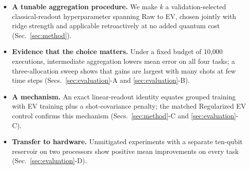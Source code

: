 \begin{itemize}
  \setlength{\itemsep}{1pt}
  \setlength{\parskip}{0pt}
  \setlength{\parsep}{0pt}
  \setlength{\topsep}{2pt}
  \item \textbf{A tunable aggregation procedure.} We make $k$ a
  validation-selected classical-readout hyperparameter spanning Raw to EV,
  chosen jointly with ridge strength and applicable retroactively at no added
  quantum cost (Sec.~\ref{sec:method}).

  \item \textbf{Evidence that the choice matters.} Under a fixed budget of
  10,000 executions, intermediate aggregation lowers mean error on all four
  tasks; a three-allocation sweep shows that gains are largest with many shots
  at few time steps
  (Secs.~\ref{sec:evaluation}-A and \ref{sec:evaluation}-B).

  \item \textbf{A mechanism.} An exact linear-readout identity equates grouped
  training with EV training plus a shot-covariance penalty; the matched
  Regularized EV control confirms this mechanism
  (Secs.~\ref{sec:method}-C and \ref{sec:evaluation}-C).

  \item \textbf{Transfer to hardware.} Unmitigated experiments with a separate
  ten-qubit reservoir on two processors show positive mean improvements on
  every task (Sec.~\ref{sec:evaluation}-D).
\end{itemize}
